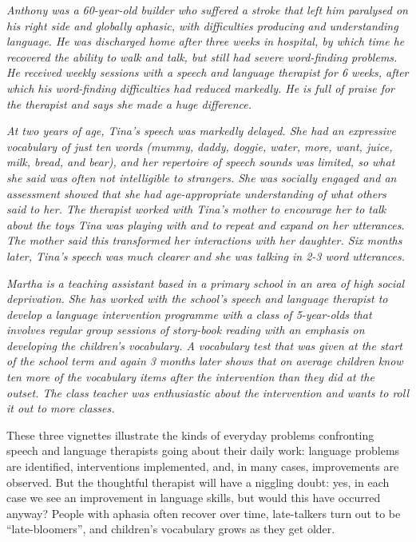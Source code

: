 \documentclass{krantz}
\begin{document}
\begin{shaded}
\textit{Anthony was a 60-year-old builder who suffered a stroke that left him paralysed on his right side and globally aphasic, with difficulties producing and understanding language. He was discharged home after three weeks in hospital, by which time he recovered the ability to walk and talk, but still had severe word-finding problems. He received weekly sessions with a speech and language therapist for 6 weeks, after which his word-finding difficulties had reduced markedly. He is full of praise for the therapist and says she made a huge difference.}
\end{shaded}
\begin{shaded}
\textit{At two years of age, Tina's speech was markedly delayed. She had an expressive vocabulary of just ten words (mummy, daddy, doggie, water, more, want, juice, milk, bread, and bear), and her repertoire of speech sounds was limited, so what she said was often not intelligible to strangers. She was socially engaged and an assessment showed that she had age-appropriate understanding of what others said to her. The therapist worked with Tina's mother to encourage her to talk about the toys Tina was playing with and to repeat and expand on her utterances. The mother said this transformed her interactions with her daughter. Six months later, Tina's speech was much clearer and she was talking in 2-3 word utterances.}
\end{shaded}
\begin{shaded}
\textit{Martha is a teaching assistant based in a primary school in an area of high social deprivation. She has worked with the school's speech and language therapist to develop a language intervention programme with a class of 5-year-olds that involves regular group sessions of story-book reading with an emphasis on developing the children's vocabulary. A vocabulary test that was given at the start of the school term and again 3 months later shows that on average children know ten more of the vocabulary items after the intervention than they did at the outset. The class teacher was enthusiastic about the intervention and wants to roll it out to more classes.}
\end{shaded}

These three vignettes illustrate the kinds of everyday problems confronting speech and language therapists going about their daily work: language problems are identified, interventions implemented, and, in many cases, improvements are observed. But the thoughtful therapist will have a niggling doubt: yes, in each case we see an improvement in language skills, but would this have occurred anyway? People with aphasia often recover over time, late-talkers turn out to be ``late-bloomers'', and children's vocabulary grows as they get older.
\end{document}
